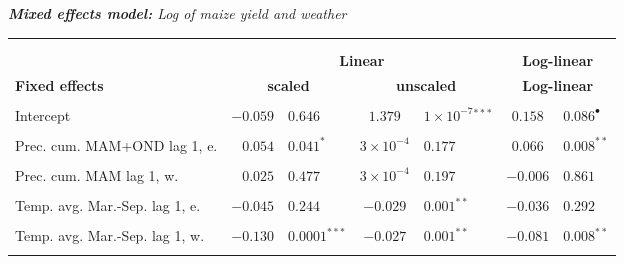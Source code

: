\documentclass[a4paper,12pt]{article}
\begin{document}
{\centering
\begin{threeparttable}


\singlespacing
\caption{\textit{\textbf{Mixed  effects model:} Log of maize yield and weather}}
 
\label{Peggy45ln} 
\centering
\begin{small}
\begin{tabular}{lrlclcl} 
\hline \vspace{-0.2cm} \\
  
\vspace{-0.2cm} \\

  \multicolumn{1}{l}{\vspace{0.1cm}}  &\multicolumn{4}{c}{\textbf{Linear}}& \multicolumn{2}{c}{{\textbf{Log-linear}}}  \\
  
  \multicolumn{1}{l}{\vspace{0.1cm}\textbf{Fixed effects}}  &\multicolumn{2}{c}{{\textbf{scaled}}}& \multicolumn{2}{c}{{\textbf{unscaled\tnote{a}}}}& \multicolumn{2}{c}{{\textbf{Log-linear}}}  \\
 \hline 
\hline
\\
\vspace{-0.2cm}Intercept&$-0.059$&$0.646$&$1.379$&$1\times10^{-7}$$^{***}$&$0.158$&$0.086^{\bullet}$\\
  \\
\vspace{-0.2cm}Prec. cum. MAM+OND lag 1, e.&$0.054$&$0.041^{*}$&$3\times10^{-4}$&$0.177$&$0.066$&$0.008^{**}$\\
  \\
  \vspace{-0.2cm}Prec. cum. MAM lag 1, w.&$0.025$&$0.477$&$3\times10^{-4}$&$0.197$&$-0.006$&$0.861$\\
  \\
  \vspace{-0.2cm}Temp. avg. Mar.-Sep. lag 1, e.&$-0.045$&$0.244$&$-0.029$&$0.001^{**}$&$-0.036$&$0.292$\\
  \\
    \vspace{-0.2cm}Temp. avg. Mar.-Sep. lag 1, w.&$-0.130$&$0.0001^{***}$&$-0.027$&$0.001^{**}$&$-0.081$&$0.008^{**}$\\
  \\
  

\end{tabular}
\end{small}
\end{threeparttable}}
\end{document}
